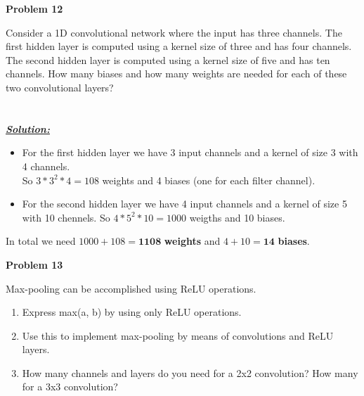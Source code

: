 \documentclass{article}
\begin{document}
\vspace{2cm}
\noindent \textbf{Problem 12}

\noindent Consider a 1D convolutional network where the input has three channels. The first 
hidden layer is computed using a kernel size of three and has four channels. The second
hidden layer is computed using a kernel size of five and has ten channels. How many 
biases and how many weights are needed for each of these two convolutional layers? \\ \\ \\

\noindent \underline{\textbf{\textit{Solution:}}} \\ 

\begin{itemize}
  \item  For the first hidden layer we have 3 input channels and a kernel of size 3 with 4 channels. \\So $3*3^2*4=108$ weights and 4 biases (one for each filter channel).
  \item  For the second hidden layer we have 4 input channels and a kernel of size 5 with 10 chennels. So $4*5^2*10=1000$ weigths and 10 biases.
\end{itemize}
In total we need $1000+108=\bm{1108}$ \textbf{weights} and $4+10=\bm{14}$ \textbf{biases}.  



\newpage
\noindent \textbf{Problem 13}

\noindent Max-pooling can be accomplished using ReLU operations.
\begin{enumerate} [label=\Alph*]
    
    \item Express max(a, b) by using only ReLU operations.
    \item Use this to implement max-pooling by means of convolutions and ReLU layers.
    \item How many channels and layers do you need for a 2x2 convolution? How many for a 3x3 convolution?\\ \\ \\
\end{enumerate}\
\end{document}
